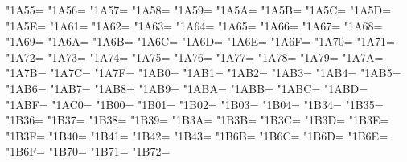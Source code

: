 \XeTeXcharclass"1A55=\KclassCM
\XeTeXcharclass"1A56=\KclassCM
\XeTeXcharclass"1A57=\KclassCM
\XeTeXcharclass"1A58=\KclassCM
\XeTeXcharclass"1A59=\KclassCM
\XeTeXcharclass"1A5A=\KclassCM
\XeTeXcharclass"1A5B=\KclassCM
\XeTeXcharclass"1A5C=\KclassCM
\XeTeXcharclass"1A5D=\KclassCM
\XeTeXcharclass"1A5E=\KclassCM
\XeTeXcharclass"1A61=\KclassCM
\XeTeXcharclass"1A62=\KclassCM
\XeTeXcharclass"1A63=\KclassCM
\XeTeXcharclass"1A64=\KclassCM
\XeTeXcharclass"1A65=\KclassCM
\XeTeXcharclass"1A66=\KclassCM
\XeTeXcharclass"1A67=\KclassCM
\XeTeXcharclass"1A68=\KclassCM
\XeTeXcharclass"1A69=\KclassCM
\XeTeXcharclass"1A6A=\KclassCM
\XeTeXcharclass"1A6B=\KclassCM
\XeTeXcharclass"1A6C=\KclassCM
\XeTeXcharclass"1A6D=\KclassCM
\XeTeXcharclass"1A6E=\KclassCM
\XeTeXcharclass"1A6F=\KclassCM
\XeTeXcharclass"1A70=\KclassCM
\XeTeXcharclass"1A71=\KclassCM
\XeTeXcharclass"1A72=\KclassCM
\XeTeXcharclass"1A73=\KclassCM
\XeTeXcharclass"1A74=\KclassCM
\XeTeXcharclass"1A75=\KclassCM
\XeTeXcharclass"1A76=\KclassCM
\XeTeXcharclass"1A77=\KclassCM
\XeTeXcharclass"1A78=\KclassCM
\XeTeXcharclass"1A79=\KclassCM
\XeTeXcharclass"1A7A=\KclassCM
\XeTeXcharclass"1A7B=\KclassCM
\XeTeXcharclass"1A7C=\KclassCM
\XeTeXcharclass"1A7F=\KclassCM
\XeTeXcharclass"1AB0=\KclassCM
\XeTeXcharclass"1AB1=\KclassCM
\XeTeXcharclass"1AB2=\KclassCM
\XeTeXcharclass"1AB3=\KclassCM
\XeTeXcharclass"1AB4=\KclassCM
\XeTeXcharclass"1AB5=\KclassCM
\XeTeXcharclass"1AB6=\KclassCM
\XeTeXcharclass"1AB7=\KclassCM
\XeTeXcharclass"1AB8=\KclassCM
\XeTeXcharclass"1AB9=\KclassCM
\XeTeXcharclass"1ABA=\KclassCM
\XeTeXcharclass"1ABB=\KclassCM
\XeTeXcharclass"1ABC=\KclassCM
\XeTeXcharclass"1ABD=\KclassCM
\XeTeXcharclass"1ABF=\KclassCM
\XeTeXcharclass"1AC0=\KclassCM
\XeTeXcharclass"1B00=\KclassCM
\XeTeXcharclass"1B01=\KclassCM
\XeTeXcharclass"1B02=\KclassCM
\XeTeXcharclass"1B03=\KclassCM
\XeTeXcharclass"1B04=\KclassCM
\XeTeXcharclass"1B34=\KclassCM
\XeTeXcharclass"1B35=\KclassCM
\XeTeXcharclass"1B36=\KclassCM
\XeTeXcharclass"1B37=\KclassCM
\XeTeXcharclass"1B38=\KclassCM
\XeTeXcharclass"1B39=\KclassCM
\XeTeXcharclass"1B3A=\KclassCM
\XeTeXcharclass"1B3B=\KclassCM
\XeTeXcharclass"1B3C=\KclassCM
\XeTeXcharclass"1B3D=\KclassCM
\XeTeXcharclass"1B3E=\KclassCM
\XeTeXcharclass"1B3F=\KclassCM
\XeTeXcharclass"1B40=\KclassCM
\XeTeXcharclass"1B41=\KclassCM
\XeTeXcharclass"1B42=\KclassCM
\XeTeXcharclass"1B43=\KclassCM
\XeTeXcharclass"1B6B=\KclassCM
\XeTeXcharclass"1B6C=\KclassCM
\XeTeXcharclass"1B6D=\KclassCM
\XeTeXcharclass"1B6E=\KclassCM
\XeTeXcharclass"1B6F=\KclassCM
\XeTeXcharclass"1B70=\KclassCM
\XeTeXcharclass"1B71=\KclassCM
\XeTeXcharclass"1B72=\KclassCM
